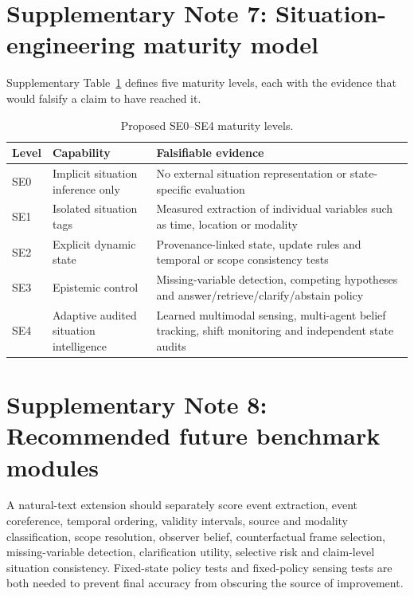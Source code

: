 \documentclass[Numbered]{sn-jnl}
\begin{document}
\section*{Supplementary Note 7: Situation-engineering maturity model}
Supplementary Table~\ref{stab:maturity} defines five maturity levels, each with
the evidence that would falsify a claim to have reached it.

\begin{table}[!ht]
\centering
\caption{Proposed SE0--SE4 maturity levels.}
\label{stab:maturity}
\begin{tabularx}{\linewidth}{p{1.0cm}p{3.4cm}X}
\toprule
Level & Capability & Falsifiable evidence \\
\midrule
SE0 & Implicit situation inference only & No external situation representation or state-specific evaluation \\
SE1 & Isolated situation tags & Measured extraction of individual variables such as time, location or modality \\
SE2 & Explicit dynamic state & Provenance-linked state, update rules and temporal or scope consistency tests \\
SE3 & Epistemic control & Missing-variable detection, competing hypotheses and answer/retrieve/clarify/abstain policy \\
SE4 & Adaptive audited situation intelligence & Learned multimodal sensing, multi-agent belief tracking, shift monitoring and independent state audits \\
\bottomrule
\end{tabularx}
\end{table}

\section*{Supplementary Note 8: Recommended future benchmark modules}
A natural-text extension should separately score event extraction, event coreference, temporal ordering, validity intervals, source and modality classification, scope resolution, observer belief, counterfactual frame selection, missing-variable detection, clarification utility, selective risk and claim-level situation consistency. Fixed-state policy tests and fixed-policy sensing tests are both needed to prevent final accuracy from obscuring the source of improvement.
\end{document}

